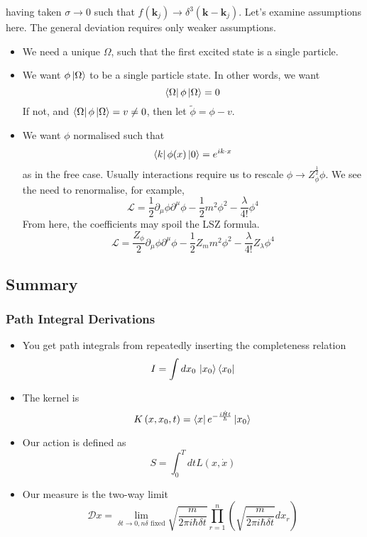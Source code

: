 \documentclass[11pt, oneside]{article}   	%
\theoremstyle{slanted}
\newcommand{\planck}{\hbar}
\let\vec\mathbf
\begin{document}
having taken $ \sigma \to 0 $ such that 
$ f \left( \vec{k} _ j  \right)  \to \delta ^ 3 \left( \vec{k} - \vec{k} _ j  \right)  $. 
Let's examine 
assumptions here. 
The general deviation requires 
only weaker assumptions. 

\begin{itemize}
\item We need a unique $ \Omega $, such that 
the first excited state is a single particle. 
\item We want $ \phi \ket{ \Omega }  $ to be a 
single particle state. In 
other words, we want 
\[
\bra{ \Omega} \phi \ket{ \Omega}  = 0 
\] If not, and $ \bra{ \Omega } \phi \ket{ \Omega }  = v \neq 0 $, 
then let $ \tilde{ \phi }  = \phi  -v   $. 
\item We want $ \phi $ normalised such that 
\[
\bra{ k }\phi ( x )\ket{ 0 }  = e ^{ i k \cdot  x } 
\] as in the free case. Usually interactions require us 
to rescale $ \phi \to Z_{ \phi } ^{ \frac{1}{2 } } \phi $.
We see the need to renormalise, for example, 
\[
\mathcal{ L } = \frac{1}{2 } \partial _ \mu \phi \partial  ^ \mu 
\phi  - \frac{1}{2 } m ^ 2 \phi ^ 2  - \frac{\lambda }{ 4 ! } \phi ^ 4 
\] From here, the coefficients 
may spoil the LSZ formula. 
\[
\mathcal{ L }  = \frac{Z _ \phi }{ 2 } 
\partial  _ \mu \phi \partial  ^ \mu \phi  - \frac{1}{2 } 
Z _ m m ^ 2 \phi ^ 2  - \frac{ \lambda }{ 4 ! } Z _ \lambda \phi ^ 4 
\] 
\end{itemize}


\subsection*{Summary}

\subsubsection{Path Integral Derivations}
\begin{itemize}
\item You get path integrals from repeatedly inserting 
the completeness relation 
\[
I = \int dx_0 \, \ket{x_0 }\bra{ x_0 } 
\]
\item The kernel is 
\[
K \left( x, x_0 ,t   \right)   = \bra{x}e^{ -\frac{i \hat{H } t }{ \planck}}\ket{ x_0}
\] 
\item Our action is defined as 
\[
S  = \int_{ 0 } ^ T dt L \left(  x , \dot{ x }  \right) 
\] 
\item Our measure is the two-way limit 
\[
\mathcal{ D } x  = \lim_{ \delta t \to 0 , n \delta \text{ fixed}} 
\sqrt{\frac{m}{ 2 \pi i \planck \delta t } }  \prod_{ r  = 1 } ^ n 
\left( \sqrt{  \frac{m  }{2 \pi i \planck \delta t  }} dx _r  \right) 
\] 
\end{itemize}
\end{document}
